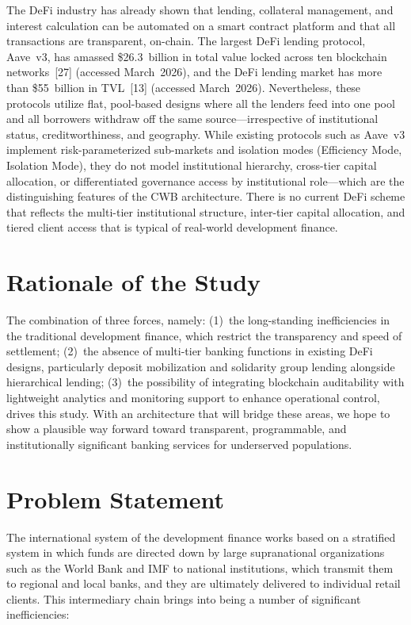 \documentclass[12pt,a4paper]{report}
\begin{document}
The DeFi industry has already shown that lending, collateral management, and interest calculation can be automated on a smart contract platform and that all transactions are transparent, on-chain. The largest DeFi lending protocol, Aave~v3, has amassed \$26.3~billion in total value locked across ten blockchain networks~[27] (accessed March~2026), and the DeFi lending market has more than \$55~billion in TVL~[13] (accessed March~2026). Nevertheless, these protocols utilize flat, pool-based designs where all the lenders feed into one pool and all borrowers withdraw off the same source---irrespective of institutional status, creditworthiness, and geography. While existing protocols such as Aave~v3 implement risk-parameterized sub-markets and isolation modes (Efficiency Mode, Isolation Mode), they do not model institutional hierarchy, cross-tier capital allocation, or differentiated governance access by institutional role---which are the distinguishing features of the CWB architecture. There is no current DeFi scheme that reflects the multi-tier institutional structure, inter-tier capital allocation, and tiered client access that is typical of real-world development finance.

\section{Rationale of the Study}

The combination of three forces, namely: (1)~the long-standing inefficiencies in the traditional development finance, which restrict the transparency and speed of settlement; (2)~the absence of multi-tier banking functions in existing DeFi designs, particularly deposit mobilization and solidarity group lending alongside hierarchical lending; (3)~the possibility of integrating blockchain auditability with lightweight analytics and monitoring support to enhance operational control, drives this study. With an architecture that will bridge these areas, we hope to show a plausible way forward toward transparent, programmable, and institutionally significant banking services for underserved populations.

\section{Problem Statement}

The international system of the development finance works based on a stratified system in which funds are directed down by large supranational organizations such as the World Bank and IMF to national institutions, which transmit them to regional and local banks, and they are ultimately delivered to individual retail clients. This intermediary chain brings into being a number of significant inefficiencies:
\end{document}
